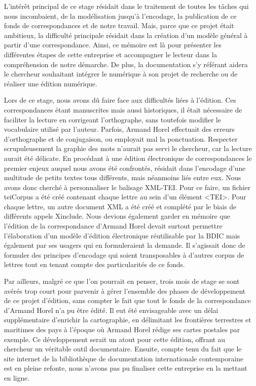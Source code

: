 \documentclass[12pt,a4paper]{book} %
\begin{document}
L'intérêt principal de ce stage résidait dans le traitement de toutes les tâches qui nous incombaient, de la modélisation jusqu'à l'encodage, la publication de ce fonds de correspondances et de notre travail. Mais, parce que ce projet était ambitieux, la difficulté principale résidait dans la création d'un modèle général à partir d'une correspondance. Ainsi, ce mémoire est là pour présenter les différentes étapes de cette entreprise et accompagner le lecteur dans la compréhension de notre démarche. De plus, la documentation s'y référant aidera le chercheur souhaitant intégrer le numérique à son projet de recherche ou de réaliser une édition numérique.


Lors de ce stage, nous avons dû faire face aux difficultés liées à l'édition. Ces correspondances étant manuscrites mais aussi historiques, il était nécessaire de faciliter la lecture en corrigeant l'orthographe, sans toutefois modifier le vocabulaire utilisé par l'auteur. Parfois, Armand Horel effectuait des erreurs d'orthographe et de conjugaison, ou employait mal la ponctuation. Respecter scrupuleusement la graphie des mots n'aurait pas servi le chercheur, car la lecture aurait été délicate. En procédant à une édition électronique de correspondances le premier enjeux auquel nous avons été confrontés, résidait dans l'encodage d'une multitude de petits textes tous différents, mais néanmoins liés entre eux. Nous avons donc cherché à personnaliser le balisage XML-TEI. Pour ce faire, un fichier teiCorpus a été créé contenant chaque lettre au sein d'un élément <TEI>. Pour chaque lettre, un autre document XML a été créé et complété par le biais de différents appels Xinclude. Nous devions également garder en mémoire que l'édition de la correspondance d'Armand Horel devait surtout permettre l'élaboration d'un modèle d'édition électronique réutilisable par la BDIC mais également par ses usagers qui en formuleraient la demande. Il s'agissait donc de formuler des principes d'encodage qui soient transposables à d'autres corpus de lettres tout en tenant compte des particularités de ce fonds. 

Par ailleurs, malgré ce que l'on pourrait en penser, trois mois de stage se sont avérés trop court pour parvenir à gérer l'ensemble des phases de développement de ce projet d'édition, sans compter le fait que tout le fonds de la correspondance d'Armand Horel n'a pu être édité. Il eut été envisageable avec un délai supplémentaire d'enrichir la cartographie, en délimitant les frontières terrestres et maritimes des pays à l'époque où Armand Horel rédige ses cartes postales par exemple. Ce développement serait un atout pour cette édition, offrant au chercheur un véritable outil documentaire. Ensuite, compte tenu du fait que le site internet de la bibliothèque de documentation internationale contemporaine est en pleine refonte, nous n'avons pas pu finaliser cette entreprise en la mettant en ligne. 
\end{document}
